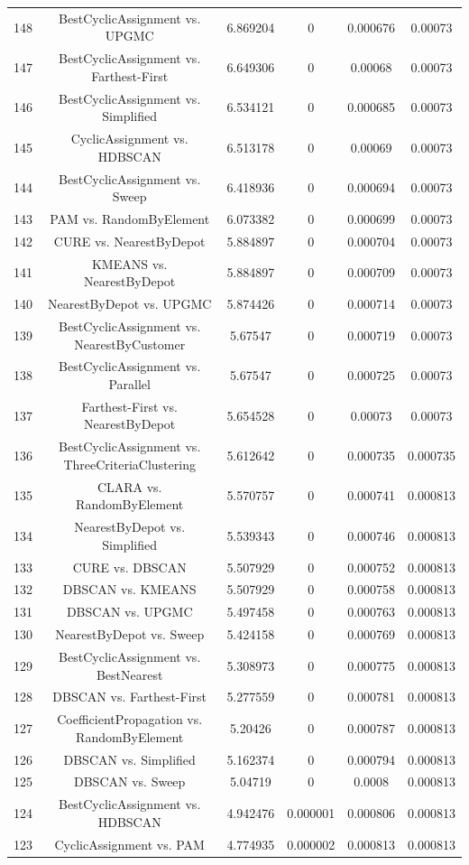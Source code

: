 \documentclass[a4paper,10pt]{article}
\begin{document}
\begin{landscape}
\begin{table}[!htp]
\begin{tabular}{cccccc}
148&BestCyclicAssignment vs. UPGMC&6.869204&0&0.000676&0.00073\\
147&BestCyclicAssignment vs. Farthest-First&6.649306&0&0.00068&0.00073\\
146&BestCyclicAssignment vs. Simplified&6.534121&0&0.000685&0.00073\\
145&CyclicAssignment vs. HDBSCAN&6.513178&0&0.00069&0.00073\\
144&BestCyclicAssignment vs. Sweep&6.418936&0&0.000694&0.00073\\
143&PAM vs. RandomByElement&6.073382&0&0.000699&0.00073\\
142&CURE vs. NearestByDepot&5.884897&0&0.000704&0.00073\\
141&KMEANS vs. NearestByDepot&5.884897&0&0.000709&0.00073\\
140&NearestByDepot vs. UPGMC&5.874426&0&0.000714&0.00073\\
139&BestCyclicAssignment vs. NearestByCustomer&5.67547&0&0.000719&0.00073\\
138&BestCyclicAssignment vs. Parallel&5.67547&0&0.000725&0.00073\\
137&Farthest-First vs. NearestByDepot&5.654528&0&0.00073&0.00073\\
136&BestCyclicAssignment vs. ThreeCriteriaClustering&5.612642&0&0.000735&0.000735\\
135&CLARA vs. RandomByElement&5.570757&0&0.000741&0.000813\\
134&NearestByDepot vs. Simplified&5.539343&0&0.000746&0.000813\\
133&CURE vs. DBSCAN&5.507929&0&0.000752&0.000813\\
132&DBSCAN vs. KMEANS&5.507929&0&0.000758&0.000813\\
131&DBSCAN vs. UPGMC&5.497458&0&0.000763&0.000813\\
130&NearestByDepot vs. Sweep&5.424158&0&0.000769&0.000813\\
129&BestCyclicAssignment vs. BestNearest&5.308973&0&0.000775&0.000813\\
128&DBSCAN vs. Farthest-First&5.277559&0&0.000781&0.000813\\
127&CoefficientPropagation vs. RandomByElement&5.20426&0&0.000787&0.000813\\
126&DBSCAN vs. Simplified&5.162374&0&0.000794&0.000813\\
125&DBSCAN vs. Sweep&5.04719&0&0.0008&0.000813\\
124&BestCyclicAssignment vs. HDBSCAN&4.942476&0.000001&0.000806&0.000813\\
123&CyclicAssignment vs. PAM&4.774935&0.000002&0.000813&0.000813\\

\end{tabular}
\end{table}
\end{landscape}
\end{document}
